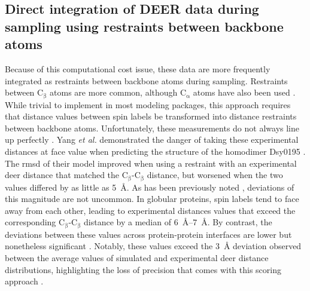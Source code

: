 \subsection{Direct integration of DEER data during sampling using restraints between backbone atoms}\label{sec:deerintro_main_integration}

Because of this computational cost issue, these data are more frequently integrated as restraints between backbone atoms during sampling. Restraints between $\mathrm{C_{\upbeta}}$ atoms are more common, although $\mathrm{C_{\upalpha}}$ atoms have also been used \citep*{Park2006, Sale2004}. While trivial to implement in most modeling packages, this approach requires that distance values between spin labels be transformed into distance restraints between backbone atoms. Unfortunately, these measurements do not always line up perfectly \citep*{Hirst2011}. Yang \emph{et al.} demonstrated the danger of taking these experimental distances at face value when predicting the structure of the homodimer Dsy0195 \citep*{Yang2010}. The \gls{rmsd} of their model improved when using a restraint with an experimental \gls{deer} distance that matched the $\mathrm{C_{\upbeta}}$-$\mathrm{C_{\upbeta}}$ distance, but worsened when the two values differed by as little as \SI{5}{\angstrom}. As has been previously noted \citep*{Alexander2008, Bhatnagar2007, Borbat2002, Fischer2016, Georgieva2013, Jeschke2013, Sale2005}, deviations of this magnitude are not uncommon. In globular proteins, spin labels tend to face away from each other, leading to experimental distances values that exceed the corresponding $\mathrm{C_{\upbeta}}$-$\mathrm{C_{\upbeta}}$ distance by a median of \SIrange{6}{7}{\angstrom}. By contrast, the deviations between these values across protein-protein interfaces are lower but nonetheless significant \citep*{Bhatnagar2007, Fischer2016, Kim2011}. Notably, these values exceed the \SI{3}{\angstrom} deviation observed between the average values of simulated and experimental \gls{deer} distance distributions, highlighting the loss of precision that comes with this scoring approach \citep*{Sale2005}.

